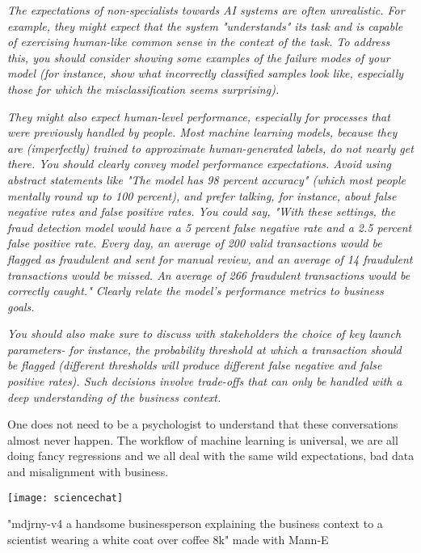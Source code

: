 \textit{The expectations of non-specialists towards AI systems are often unrealistic. For example, they might expect that the system "understands" its task and is capable of exercising human-like common sense in the context of the task. To address this, you should consider showing some examples of the failure modes of your model (for instance, show what incorrectly classified samples look like, especially those for which the misclassification seems surprising).} 

\textit{They might also expect human-level performance, especially for processes that were previously handled by people. Most machine learning models, because they are (imperfectly) trained to approximate human-generated labels, do not nearly get there. You should clearly convey model performance expectations. Avoid using abstract statements like "The model has 98 percent accuracy" (which most people mentally round up to 100 percent), and prefer talking, for instance, about false negative rates and false positive rates. You could say, "With these settings, the fraud detection model would have a 5 percent false negative rate and a 2.5 percent false positive rate. Every day, an average of 200 valid transactions would be flagged as fraudulent and sent for manual review, and an average of 14 fraudulent transactions would be missed. An average of 266 fraudulent transactions would be correctly caught." Clearly relate the model's performance metrics to business goals.}


\textit{You should also make sure to discuss with stakeholders the choice of key launch parameters- for instance, the probability threshold at which a transaction should be flagged (different thresholds will produce different false negative and false positive rates). Such decisions involve trade-offs that can only be handled with a deep understanding of the business context.}\cite{chollet2022} 

One does not need to be a psychologist to understand that these conversations almost never happen. The workflow of machine learning is universal, we are all doing fancy regressions and we all deal with the same wild expectations, bad data and misalignment with business.

\begin{marginfigure}[-5.5cm]
        \texttt{[image: sciencechat]}
        \caption{"mdjrny-v4 a handsome businessperson explaining the business context to a scientist wearing a white coat over coffee 8k" made with Mann-E}
\end{marginfigure}


